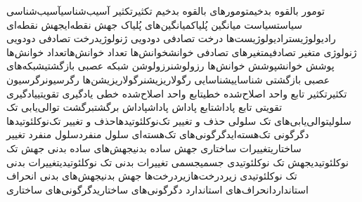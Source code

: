 {تومور بالقوه بدخیم}{تومورهای بالقوه بدخیم}
{تکثیر}{تکثیر}
{آسیب‌شناسی}{آسیب‌شناسی}
{سیاست}{سیاست}
{میانگین پُلیاک}{میانگین‌های پُلیاک}
{جهش نقطه‌ای}{جهش نقطه‌ای}
{رادیولوژیست}{رادیولوژیست‌ها}
{درخت تصادفی دودویی ژنولوژی}{درخت تصادفی دودویی ژنولوژی}
{متغیر تصادفی}{متغیرهای تصادفی}
{خوانش}{خوانش‌ها}
{تعداد خوانش‌ها}{تعداد خوانش‌ها}
{پوشش خوانش}{پوشش خوانش‌ها}
{رزولوشن}{رزولوشن}
{شبکه‌ عصبی بازگشتی}{شبکه‌های عصبی بازگشتی}
{شناسایی}{شناسایی}
{رگولاریزیشن}{رگولاریزیشن‌ها}
{رگرسیون}{رگرسیون}
{تکثیر}{تکثیر}
{تابع واحد اصلاح‌شده خطی}{تابع واحد اصلاح‌شده خطی}
{یادگیری تقویتی}{یادگیری تقویتی}
{تابع پاداش}{تابع پاداش}
{پاداش}{پاداش}
{برگشت}{برگشت}
{توالی‌یابی تک سلولی}{توالی‌یابی‌های تک سلولی}
{حذف و تغییر تک‌نوکلئوتیدها}{حذف و تغییر تک‌نوکلئوتیدها}
{دگرگونی تک‌هسته‌ای}{دگرگونی‌های تک‌هسته‌ای}
{سلول منفرد}{سلول منفرد}
{تغییر ساختاری}{تغییرات ساختاری}
{جهش ساده بدنی}{جهش‌های ساده بدنی}
{جهش تک نوکلئوتیدی}{جهش تک نوکلئوتیدی}
{جسمی}{جسمی}
{تغییرات بدنی تک نوکلئوتیدی}{تغییرات بدنی تک نوکلئوتیدی}
{زیردرخت‌ها}{زیردرخت‌ها}
{جهش بدنی}{جهش‌های بدنی}
{انحراف استاندارد}{انحراف‌های استاندارد}
{دگرگونی‌های ساختاری}{دگرگونی‌های ساختاری}
